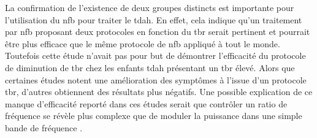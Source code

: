 La confirmation de l'existence de deux groupes distincts est importante pour l'utilisation du \gls{nfb} pour traiter le \gls{tdah}. En effet, cela indique 
qu'un traitement par \gls{nfb} proposant deux protocoles en fonction du \gls{tbr} serait pertinent et pourrait être plus efficace que le même protocole 
de \gls{nfb} appliqué à tout le monde. Toutefois cette étude n'avait pas pour but de démontrer l'efficacité du protocole de diminution de \gls{tbr} chez les 
enfants \gls{tdah} présentant un \gls{tbr} élevé. Alors que certaines études notent une amélioration des symptômes à l'issue d'un protocole \gls{tbr}, 
d'autres obtiennent des résultats plus négatifs. Une possible explication de ce manque d'efficacité reporté dans ces études serait que contrôler 
un ratio de fréquence se révèle plus complexe que de moduler la puissance dans une simple bande de fréquence \citep{Rogala2016}. 

